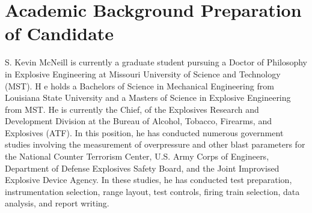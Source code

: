 \section{Academic Background Preparation of Candidate}
S. Kevin McNeill is currently a graduate student pursuing a Doctor of Philosophy in Explosive Engineering at Missouri University of Science and Technology (MST). H	e holds a Bachelors of Science in Mechanical Engineering from Louisiana State University and a Masters of Science in Explosive Engineering from MST. He is currently the Chief, of the Explosives Research and Development Division at the Bureau of Alcohol, Tobacco, Firearms, and Explosives (ATF).  In this position, he has conducted numerous government studies involving the measurement of overpressure and other blast parameters for the National Counter Terrorism Center, U.S. Army Corps of Engineers, Department of Defense Explosives Safety Board, and the Joint Improvised Explosive Device Agency.  In these studies, he has conducted test preparation, instrumentation selection, range layout, test controls, firing train selection, data analysis, and report writing.
